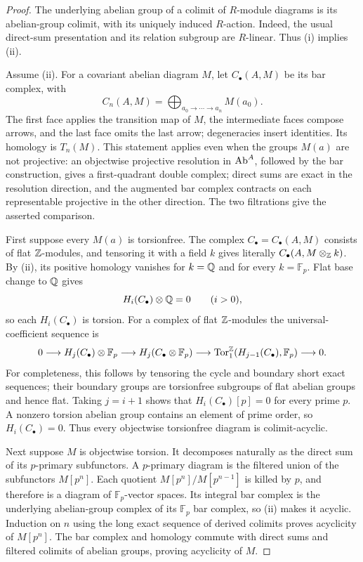 \begin{proof}
The underlying abelian group of a colimit of $R$-module diagrams is its abelian-group colimit, with its uniquely induced $R$-action. Indeed, the usual direct-sum presentation and its relation subgroup are $R$-linear. Thus (i) implies (ii).

Assume (ii). For a covariant abelian diagram $M$, let $C_\bullet(A,M)$ be its bar complex, with
\[
C_n(A,M)=\bigoplus_{a_0\to\cdots\to a_n}M(a_0).
\]
The first face applies the transition map of $M$, the intermediate faces compose arrows, and the last face omits the last arrow; degeneracies insert identities. Its homology is $T_n(M)$. This statement applies even when the groups $M(a)$ are not projective: an objectwise projective resolution in $\mathrm{Ab}^A$, followed by the bar construction, gives a first-quadrant double complex; direct sums are exact in the resolution direction, and the augmented bar complex contracts on each representable projective in the other direction. The two filtrations give the asserted comparison.

First suppose every $M(a)$ is torsionfree. The complex $C_\bullet=C_\bullet(A,M)$ consists of flat $\mathbb Z$-modules, and tensoring it with a field $k$ gives literally $C_\bullet(A,M\otimes_\mathbb Z k)$. By (ii), its positive homology vanishes for $k=\mathbb Q$ and for every $k=\mathbb F_p$. Flat base change to $\mathbb Q$ gives
\[
H_i(C_\bullet)\otimes\mathbb Q=0\qquad(i>0),
\]
so each $H_i(C_\bullet)$ is torsion. For a complex of flat $\mathbb Z$-modules the universal-coefficient sequence is
\[
0\longrightarrow H_j(C_\bullet)\otimes\mathbb F_p
\longrightarrow H_j(C_\bullet\otimes\mathbb F_p)
\longrightarrow \operatorname{Tor}^{\mathbb Z}_1(H_{j-1}(C_\bullet),\mathbb F_p)
\longrightarrow0.
\]
For completeness, this follows by tensoring the cycle and boundary short exact sequences; their boundary groups are torsionfree subgroups of flat abelian groups and hence flat. Taking $j=i+1$ shows that $H_i(C_\bullet)[p]=0$ for every prime $p$. A nonzero torsion abelian group contains an element of prime order, so $H_i(C_\bullet)=0$. Thus every objectwise torsionfree diagram is colimit-acyclic.

Next suppose $M$ is objectwise torsion. It decomposes naturally as the direct sum of its $p$-primary subfunctors. A $p$-primary diagram is the filtered union of the subfunctors $M[p^n]$. Each quotient $M[p^n]/M[p^{n-1}]$ is killed by $p$, and therefore is a diagram of $\mathbb F_p$-vector spaces. Its integral bar complex is the underlying abelian-group complex of its $\mathbb F_p$ bar complex, so (ii) makes it acyclic. Induction on $n$ using the long exact sequence of derived colimits proves acyclicity of $M[p^n]$. The bar complex and homology commute with direct sums and filtered colimits of abelian groups, proving acyclicity of $M$.


\end{proof}
